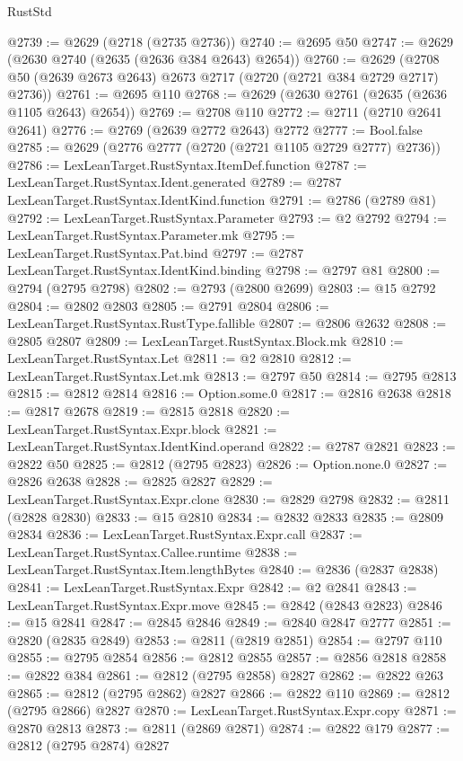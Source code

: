 \begin{lexlean}{RustStd}
\begin{coremodule}
@2739 := @2629 (@2718 (@2735 @2736))
@2740 := @2695 @50
@2747 := @2629 (@2630 @2740 (@2635 (@2636 @384 @2643) @2654))
@2760 := @2629 (@2708 @50 (@2639 @2673 @2643) @2673 @2717 (@2720 (@2721 @384 @2729 @2717) @2736))
@2761 := @2695 @110
@2768 := @2629 (@2630 @2761 (@2635 (@2636 @1105 @2643) @2654))
@2769 := @2708 @110
@2772 := @2711 (@2710 @2641 @2641)
@2776 := @2769 (@2639 @2772 @2643) @2772
@2777 := Bool.false
@2785 := @2629 (@2776 @2777 (@2720 (@2721 @1105 @2729 @2777) @2736))
@2786 := LexLeanTarget.RustSyntax.ItemDef.function
@2787 := LexLeanTarget.RustSyntax.Ident.generated
@2789 := @2787 LexLeanTarget.RustSyntax.IdentKind.function
@2791 := @2786 (@2789 @81)
@2792 := LexLeanTarget.RustSyntax.Parameter
@2793 := @2 @2792
@2794 := LexLeanTarget.RustSyntax.Parameter.mk
@2795 := LexLeanTarget.RustSyntax.Pat.bind
@2797 := @2787 LexLeanTarget.RustSyntax.IdentKind.binding
@2798 := @2797 @81
@2800 := @2794 (@2795 @2798)
@2802 := @2793 (@2800 @2699)
@2803 := @15 @2792
@2804 := @2802 @2803
@2805 := @2791 @2804
@2806 := LexLeanTarget.RustSyntax.RustType.fallible
@2807 := @2806 @2632
@2808 := @2805 @2807
@2809 := LexLeanTarget.RustSyntax.Block.mk
@2810 := LexLeanTarget.RustSyntax.Let
@2811 := @2 @2810
@2812 := LexLeanTarget.RustSyntax.Let.mk
@2813 := @2797 @50
@2814 := @2795 @2813
@2815 := @2812 @2814
@2816 := Option.some.{0}
@2817 := @2816 @2638
@2818 := @2817 @2678
@2819 := @2815 @2818
@2820 := LexLeanTarget.RustSyntax.Expr.block
@2821 := LexLeanTarget.RustSyntax.IdentKind.operand
@2822 := @2787 @2821
@2823 := @2822 @50
@2825 := @2812 (@2795 @2823)
@2826 := Option.none.{0}
@2827 := @2826 @2638
@2828 := @2825 @2827
@2829 := LexLeanTarget.RustSyntax.Expr.clone
@2830 := @2829 @2798
@2832 := @2811 (@2828 @2830)
@2833 := @15 @2810
@2834 := @2832 @2833
@2835 := @2809 @2834
@2836 := LexLeanTarget.RustSyntax.Expr.call
@2837 := LexLeanTarget.RustSyntax.Callee.runtime
@2838 := LexLeanTarget.RustSyntax.Item.lengthBytes
@2840 := @2836 (@2837 @2838)
@2841 := LexLeanTarget.RustSyntax.Expr
@2842 := @2 @2841
@2843 := LexLeanTarget.RustSyntax.Expr.move
@2845 := @2842 (@2843 @2823)
@2846 := @15 @2841
@2847 := @2845 @2846
@2849 := @2840 @2847 @2777
@2851 := @2820 (@2835 @2849)
@2853 := @2811 (@2819 @2851)
@2854 := @2797 @110
@2855 := @2795 @2854
@2856 := @2812 @2855
@2857 := @2856 @2818
@2858 := @2822 @384
@2861 := @2812 (@2795 @2858) @2827
@2862 := @2822 @263
@2865 := @2812 (@2795 @2862) @2827
@2866 := @2822 @110
@2869 := @2812 (@2795 @2866) @2827
@2870 := LexLeanTarget.RustSyntax.Expr.copy
@2871 := @2870 @2813
@2873 := @2811 (@2869 @2871)
@2874 := @2822 @179
@2877 := @2812 (@2795 @2874) @2827

\end{coremodule}
\end{lexlean}
